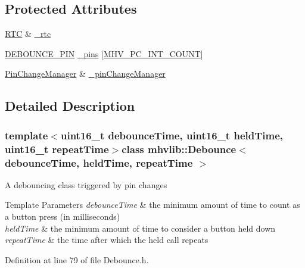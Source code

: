 \subsection*{Protected Attributes}
\begin{DoxyCompactItemize}
\item 
\hyperlink{classmhvlib_1_1_r_t_c}{R\-T\-C} \& \hyperlink{classmhvlib_1_1_debounce_a6fc47650f1f285bd100799b736bb7e08}{\-\_\-rtc}
\item 
\hyperlink{namespacemhvlib_a290c64687661f8a9ffaa662db0052f63}{D\-E\-B\-O\-U\-N\-C\-E\-\_\-\-P\-I\-N} \hyperlink{classmhvlib_1_1_debounce_a1c47f6a0b463c510752509abc41fc51a}{\-\_\-pins} \mbox{[}\hyperlink{_m_h_v__io__attiny85_8h_ac3370faa54861753416a738657731f6b}{M\-H\-V\-\_\-\-P\-C\-\_\-\-I\-N\-T\-\_\-\-C\-O\-U\-N\-T}\mbox{]}
\item 
\hyperlink{classmhvlib_1_1_pin_change_manager}{Pin\-Change\-Manager} \& \hyperlink{classmhvlib_1_1_debounce_a27200f042e5c5bad29c9c1a8a8fbad47}{\-\_\-pin\-Change\-Manager}
\end{DoxyCompactItemize}


\subsection{Detailed Description}
\subsubsection*{template$<$uint16\-\_\-t debounce\-Time, uint16\-\_\-t held\-Time, uint16\-\_\-t repeat\-Time$>$class mhvlib\-::\-Debounce$<$ debounce\-Time, held\-Time, repeat\-Time $>$}

A debouncing class triggered by pin changes 
\begin{DoxyTemplParams}{Template Parameters}
{\em debounce\-Time} & the minimum amount of time to count as a button press (in milliseconds) \\
\hline
{\em held\-Time} & the minimum amount of time to consider a button held down \\
\hline
{\em repeat\-Time} & the time after which the held call repeats \\
\hline
\end{DoxyTemplParams}


Definition at line 79 of file Debounce.\-h.



